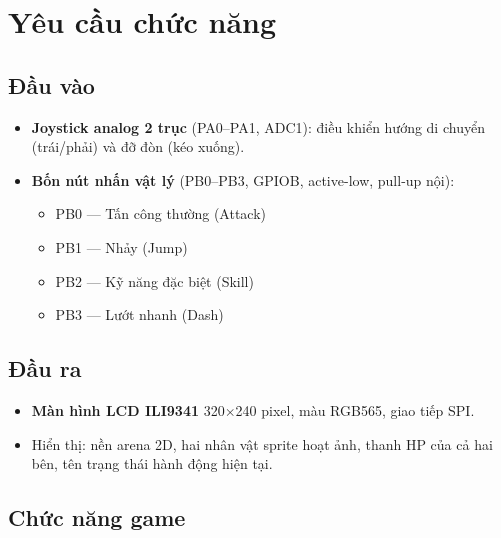 \documentclass[a4paper,12pt]{report}
\begin{document}
\section{Yêu cầu chức năng}

\subsection{Đầu vào}
\begin{itemize}
    \item \textbf{Joystick analog 2 trục} (PA0--PA1, ADC1): điều khiển hướng di chuyển (trái/phải) và đỡ đòn (kéo xuống).
    \item \textbf{Bốn nút nhấn vật lý} (PB0--PB3, GPIOB, active-low, pull-up nội):
    \begin{itemize}
        \item PB0 --- Tấn công thường (Attack)
        \item PB1 --- Nhảy (Jump)
        \item PB2 --- Kỹ năng đặc biệt (Skill)
        \item PB3 --- Lướt nhanh (Dash)
    \end{itemize}
\end{itemize}

\subsection{Đầu ra}
\begin{itemize}
    \item \textbf{Màn hình LCD ILI9341} 320$\times$240 pixel, màu RGB565, giao tiếp SPI.
    \item Hiển thị: nền arena 2D, hai nhân vật sprite hoạt ảnh, thanh HP của cả hai bên, tên trạng thái hành động hiện tại.
\end{itemize}

\subsection{Chức năng game}
\end{document}
